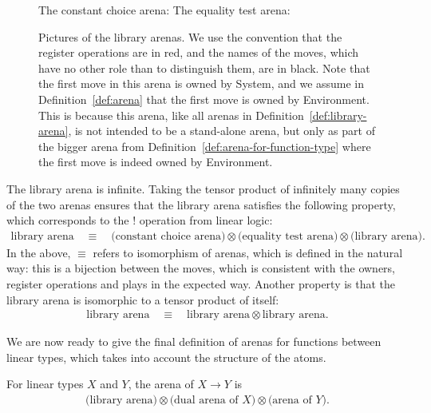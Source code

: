 \begin{figure}
The constant choice arena:
The equality test arena:
\caption{\label{fig:library-arenas} Pictures of the library arenas.  We use the convention that the register operations are in red, and the names of the moves, which have no other role than to distinguish them, are in black. 
Note that the first move in this arena is owned by System, and we assume in Definition~\ref{def:arena} that the first move is owned by Environment. This is because this arena, like all arenas in Definition~\ref{def:library-arena}, is not intended to be a stand-alone arena, but only as part of the bigger arena from Definition~\ref{def:arena-for-function-type} where the first move is indeed owned by Environment. } 
\end{figure}
       
The library arena is infinite. Taking the tensor product of infinitely many copies of the two arenas ensures that the library arena satisfies the following property, which corresponds to the $!$ operation from linear logic: 
\begin{align}\label{eq:bang-library-arena}
\text{library arena} 
\quad \equiv \quad 
\text{(constant choice arena)} \otimes 
\text{(equality test arena)} \otimes
 \text{(library arena)}.
\end{align}
In the above, $\equiv$ refers to isomorphism of arenas, which is defined in the natural way: this is a bijection between the moves, which is consistent with the owners, register operations and plays in the expected way.  Another property is that the library arena is isomorphic to a tensor product of itself: 
\begin{align}\label{eq:library-arena-isomorphism}
\text{library arena}
\quad \equiv \quad
\text{library arena} \otimes \text{library arena}.
\end{align}


We are now ready to give the final definition of arenas for functions between linear types, which takes into account the structure of the atoms.

\begin{definition}\label{def:arena-for-function-type} For linear types $X$ and $Y$, the arena of $X \to Y$ is 
    \begin{align*}
    \text{(library arena)} \otimes \text{(dual arena of $X$)} \otimes \text{(arena of $Y$)}.
    \end{align*}
\end{definition}

